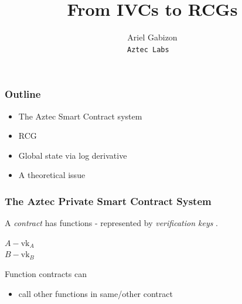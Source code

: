 \documentclass[shadesubsections,compress,14pt,mathserif]{beamer}
\title{\large{From IVCs to RCGs}}    %
\author{\small{Ariel Gabizon}\\                 %
\tt{\footnotesize{Aztec Labs}                                       } }      %
\date{}                    %
\newcommand{\nl}{\\ \pause \vspace{0.2in}}
\newcommand{\nlnp}{\\ \vspace{0.2in}}
\newcommand{\vk}{\ensuremath{\mathrm{vk} }}
\begin{document}
\boldmath
\begin{frame}
  \titlepage
\end{frame}


\begin{frame}
 \frametitle{Outline}
 
 \begin{itemize}
  \item The Aztec Smart Contract system
  \item RCG
  \item Global state via log derivative
  \item A theoretical issue
 \end{itemize}
\end{frame}
\begin{frame}
 \frametitle{The Aztec Private Smart Contract System}
A \emph{contract} has functions - represented by \emph{verification keys} .\nlnp

$A - \vk_A$\\
$B - \vk_B$\nl

Function contracts can 
\begin{itemize}
 \item call other functions in same/other contract
 \end{itemize}
 
 \end{frame}
 
\end{document}
